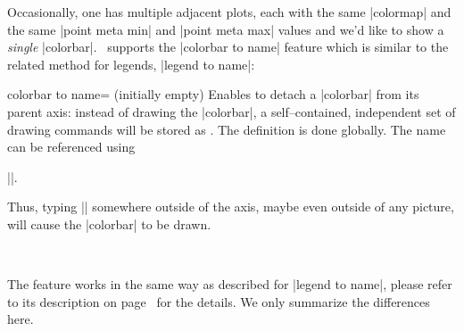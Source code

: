 Occasionally, one has multiple adjacent plots, each with the same |colormap| and the same |point meta min| and |point meta max| values and we'd like to show a \emph{single} |colorbar|. \PGFPlots\ supports the |colorbar to name| feature which is similar to the related method for legends, |legend to name|:


\begin{pgfplotskey}{colorbar to name= (initially empty)}
	Enables to detach a |colorbar| from its parent axis: instead of drawing the |colorbar|, a self--contained, independent set of drawing commands will be stored as . The definition is done globally. The name can be referenced using 

	|\pgfplotscolorbarfromname|.

Thus, typing |\pgfplotscolorbarfromname| somewhere outside of the axis, maybe even outside of any picture, will cause the |colorbar| to be drawn.
\begin{codeexample}[vbox]
\pgfplotsset{footnotesize,samples=10, domain=0:1,point meta min=0, point meta max=1}
\begin{center}%
%
%
\\

\end{center}
\end{codeexample}

	The feature works in the same way as described for |legend to name|, please refer to its description on page~\pageref{key:legend:to:name} for the details. We only summarize the differences here.


\end{pgfplotskey}
